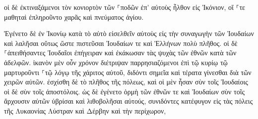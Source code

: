 \documentclass{openreader}
\begin{document}
οἱ δὲ ἐκτιναξάμενοι τὸν κονιορτὸν τῶν ⸀ποδῶν ἐπ’ αὐτοὺς ἦλθον εἰς Ἰκόνιον, 
οἵ ⸀τε μαθηταὶ ἐπληροῦντο χαρᾶς καὶ πνεύματος ἁγίου. 

Ἐγένετο δὲ ἐν Ἰκονίῳ κατὰ τὸ αὐτὸ εἰσελθεῖν αὐτοὺς εἰς τὴν συναγωγὴν τῶν Ἰουδαίων καὶ λαλῆσαι οὕτως ὥστε πιστεῦσαι Ἰουδαίων τε καὶ Ἑλλήνων πολὺ πλῆθος. 
οἱ δὲ ⸀ἀπειθήσαντες Ἰουδαῖοι ἐπήγειραν καὶ ἐκάκωσαν τὰς ψυχὰς τῶν ἐθνῶν κατὰ τῶν ἀδελφῶν. 
ἱκανὸν μὲν οὖν χρόνον διέτριψαν παρρησιαζόμενοι ἐπὶ τῷ κυρίῳ τῷ μαρτυροῦντι ⸀τῷ λόγῳ τῆς χάριτος αὐτοῦ, διδόντι σημεῖα καὶ τέρατα γίνεσθαι διὰ τῶν χειρῶν αὐτῶν. 
ἐσχίσθη δὲ τὸ πλῆθος τῆς πόλεως, καὶ οἱ μὲν ἦσαν σὺν τοῖς Ἰουδαίοις οἱ δὲ σὺν τοῖς ἀποστόλοις. 
ὡς δὲ ἐγένετο ὁρμὴ τῶν ἐθνῶν τε καὶ Ἰουδαίων σὺν τοῖς ἄρχουσιν αὐτῶν ὑβρίσαι καὶ λιθοβολῆσαι αὐτούς, 
συνιδόντες κατέφυγον εἰς τὰς πόλεις τῆς Λυκαονίας Λύστραν καὶ Δέρβην καὶ τὴν περίχωρον, 
\end{document}
